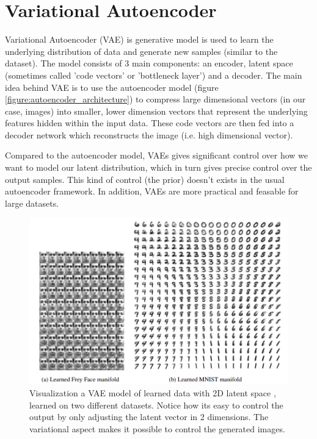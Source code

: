 \section{Variational Autoencoder}
\label{sec:vae}

Variational Autoencoder (VAE) \cite{vae} is generative model is used to learn the underlying distribution of data and generate new samples (similar to the dataset). The model consists of 3 main components: an encoder, latent space (sometimes called 'code vectors' or 'bottleneck layer') and a decoder. The main idea behind VAE is to use the autoencoder model \cite{autoencoder} \cite{autoencoder2} (figure \ref{figure:autoencoder_architecture}) to compress large dimensional vectors (in our case, images) into smaller, lower dimension vectors that represent the underlying features hidden within the input data. These code vectors are then fed into a decoder network which reconstructs the image (i.e. high dimensional vector).

Compared to the autoencoder model, VAEs gives significant control over how we want to model our latent distribution, which in turn gives precise control over the output samples. This kind of control (the prior) doesn't exists in the usual autoencoder framework. In addition, VAEs are more practical and feasable for large datasets. 



\begin{figure}
    \centering
    \includegraphics[scale=0.5]{images/vae.png}
    \caption{Visualization a VAE model of learned data with 2D latent space \cite{vae}, learned on two different datasets. Notice how its easy to control the output by only adjusting the latent vector in 2 dimensions. The variational aspect makes it possible to control the generated images.}
\end{figure}


